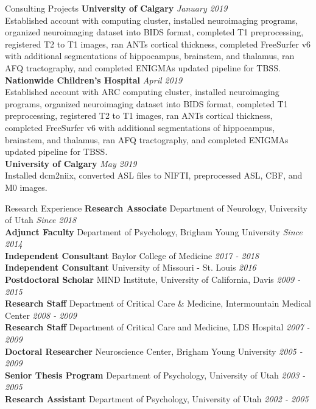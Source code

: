 \documentclass{resume} %
\begin{document}
\begin{rSection}{Consulting Projects}
	{\bf University of Calgary} \hfill {\em January 2019}\\
	Established account with computing cluster, installed neuroimaging programs, organized neuroimaging dataset into BIDS format, completed T1 preprocessing, registered T2 to T1 images, ran ANTs cortical thickness, completed FreeSurfer v6 with additional segmentations of hippocampus, brainstem, and thalamus, ran AFQ tractography, and completed ENIGMAs updated pipeline for TBSS.\\
	{\bf Nationwide Children's Hospital} \hfill {\em April 2019}\\
	Established account with ARC computing cluster, installed neuroimaging programs, organized neuroimaging dataset into BIDS format, completed T1 preprocessing, registered T2 to T1 images, ran ANTs cortical thickness, completed FreeSurfer v6 with additional segmentations of hippocampus, brainstem, and thalamus, ran AFQ tractography, and completed ENIGMAs updated pipeline for TBSS.\\
	{\bf University of Calgary} \hfill {\em May 2019}\\
	Installed dcm2niix, converted ASL files to NIFTI, preprocessed ASL, CBF, and M0 images.
\end{rSection}

\begin{rSection}{Research Experience}
	{\bf Research Associate} Department of Neurology, University of Utah \hfill {\em Since 2018}
	\\{\bf Adjunct Faculty} Department of Psychology, Brigham Young University \hfill {\em	Since 2014}
	\\{\bf Independent Consultant} Baylor College of Medicine \hfill {\em 2017 - 2018}
	\\{\bf Independent Consultant} University of Missouri - St. Louis \hfill {\em 2016}
	\\{\bf Postdoctoral Scholar} MIND Institute, University of California, Davis \hfill {\em 2009 - 2015}
	\\{\bf Research Staff} Department of Critical Care \& Medicine, Intermountain Medical Center	\hfill {\em 2008 - 2009}
	\\{\bf Research Staff} Department of Critical Care and Medicine, LDS Hospital \hfill {\em 2007 - 2009}
	\\{\bf Doctoral Researcher} Neuroscience Center, Brigham Young University \hfill {\em 2005 - 2009}
	\\{\bf Senior Thesis Program} Department of Psychology, University of Utah \hfill {\em 2003 - 2005}
	\\{\bf Research Assistant} Department of Psychology, University of Utah \hfill {\em 2002 - 2005}
\end{rSection}
\end{document}
